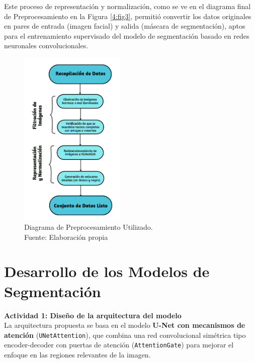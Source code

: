 Este proceso de representación y normalización, como se ve en el diagrama final de Preprocesamiento en la Figura \ref{4:fig3}, permitió convertir los datos originales en pares de entrada (imagen facial) y salida (máscara de segmentación), aptos para el entrenamiento supervisado del modelo de segmentación basado en redes neuronales convolucionales.

\begin{figure}[h]
	\begin{center}
		\includegraphics[width=0.45\textwidth]{4/figures/diagrama final prepo.png}
		\caption[Diagrama de Preprocesamiento Utilizado]{Diagrama de Preprocesamiento Utilizado.\\
		Fuente: Elaboración propia}
		\label{4:fig2}
	\end{center}
\end{figure}

\section{Desarrollo de los Modelos de Segmentación}

\textbf{Actividad 1: Diseño de la arquitectura del modelo}\\


La arquitectura propuesta se basa en el modelo \textbf{U-Net con mecanismos de atención} (\texttt{UNetAttention}), que combina una red convolucional simétrica tipo encoder-decoder con puertas de atención (\texttt{AttentionGate}) para mejorar el enfoque en las regiones relevantes de la imagen.

